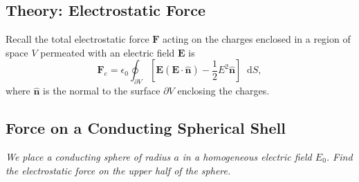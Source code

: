 \documentclass[11pt, a4paper]{article}
\newcommand{\diff}{\mathop{}\!\mathrm{d}} %
\renewcommand{\vec}[1]{\bm{#1}} %
\newcommand{\uvec}[1]{\hat{\vec{#1}}} %
\newcommand{\E}{\vec{E}}  %
\newcommand{\ee}{\epsilon_{0}}  %
\begin{document}
\subsection{Theory: Electrostatic Force}
Recall the total electrostatic force $ \vec{F} $ acting on the charges enclosed in a region of space $ V $ permeated with an electric field $ \E $ is
\begin{equation*}
	\vec{F}_{e} = \ee \oint_{\partial V}\left[\E(\E\cdot \uvec{n}) - \frac{1}{2}E^{2} \uvec{n}\right] \diff S,
\end{equation*}
where $ \uvec{n} $ is the normal to the surface $ \partial V $ enclosing the charges.


\subsection{Force on a Conducting Spherical Shell}
\textit{We place a conducting sphere of radius $ a $ in a homogeneous electric field $ E_{0} $. Find the electrostatic force on the upper half of the sphere.}
\end{document}
